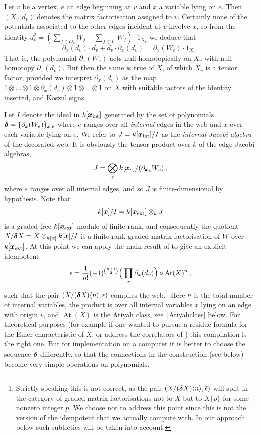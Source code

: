 \documentclass{compositio}
\theoremstyle{definition}
\numberwithin{equation}{section}
\DeclareMathOperator{\At}{At}
\begin{document}
Let $v$ be a vertex, $e$ an edge beginning at $v$ and $x$ a variable lying on $e$. Then $(X_v, d_v)$ denotes the matrix factorisation assigned to $v$. Certainly none of the potentials associated to the other edges incident at $v$ involve $x$, so from the identity $d_v^2 = (\sum_{f \in O_v} W_f - \sum_{f \in I_v} W_f) \cdot 1_{X_v}$ we deduce that
\[
\partial_x(d_v) \cdot d_v + d_v \cdot \partial_x(d_v) = \partial_x(W_e) \cdot 1_{X_v}\,.
\]
That is, the polynomial $\partial_x(W_e)$ acts null-homotopically on $X_v$ with null-homotopy $\partial_x(d_v)$. But then the same is true of $X$, of which $X_v$ is a tensor factor, provided we interpret $\partial_x(d_v)$ as the map $1 \otimes \ldots \otimes 1\otimes \partial_x(d_v) \otimes 1\otimes \ldots \otimes 1$ on $X$ with suitable factors of the identity inserted, and Koszul signs.

Let $I$ denote the ideal in $k[\boldsymbol{x}_{\textup{int}}]$ generated by the set of polynomials $\boldsymbol{\delta} = \{\partial_x(W_e)\}_{x,e}$ where $e$ ranges over all \emph{internal} edges in the web and $x$ over each variable lying on $e$. We refer to $J = k[\boldsymbol{x}_{\textup{int}}]/I$ as the \emph{internal Jacobi algebra} of the decorated web. It is obviously the tensor product over $k$ of the edge Jacobi algebras, 
\[
J = \bigotimes_{e} k[\boldsymbol{x}_e]/(\partial_{\boldsymbol{x}_e} W_e) \, ,
\]
where $e$ ranges over all internal edges, and so $J$ is finite-dimensional by hypothesis. Note that
\[
k[\boldsymbol{x}]/I = k[\boldsymbol{x}_{\textup{ext}}] \otimes_k J
\]
is a graded free $k[\boldsymbol{x}_{\textup{ext}}]$-module of finite rank, and consequently the quotient $X/\boldsymbol{\delta} X = X \otimes_{k[\boldsymbol{x}]} k[\boldsymbol{x}]/I$ is a finite-rank graded matrix factorisation of $W$ over $k[\boldsymbol{x}_{\textup{ext}}]$. At this point we can apply the main result of \cite{dm1102.2957} to give an explicit idempotent
\[
\bar\idem = \frac{1}{n!}(-1)^{\binom{n+1}{2}} \Big(\prod_x \partial_x(d_v)\Big) \circ \At(X)^n\,,
\]
such that the pair $(X/(\boldsymbol{\delta} X)\langle n \rangle, \bar{\epsilon})$ compiles the web.\footnote{Strictly speaking this is not correct, as the pair $(X/(\boldsymbol{\delta} X)\langle n \rangle, \bar{\epsilon})$ will split in the category of graded matrix factorisations not to $X$ but to $X\{ p \}$ for some nonzero integer $p$. We choose not to address this point since this is not the version of the idempotent that we actually compute with. In our approach below such subtleties will be taken into account.} Here $n$ is the total number of internal variables, the product is over all internal variables $x$ lying on an edge with origin $v$, and $\At(X)$ is the Atiyah class, see~\eqref{Atiyahclass} below. For theoretical purposes (for example if one wanted to pursue a residue formula for the Euler characteristic of $X$, or address the correlators of \cite{kr0404189}) this compilation is the right one. But for implementation on a computer it is better to choose the sequence $\boldsymbol{\delta}$ differently, so that the connections in the construction (see below) become very simple operations on polynomials.
\\
\end{document}
